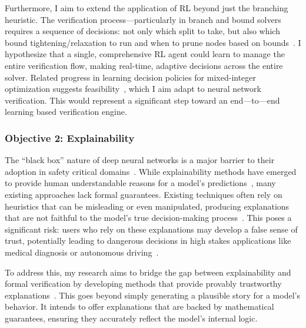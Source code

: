 \documentclass{llncs}
\begin{document}
Furthermore, I aim to extend the application of RL beyond just the branching heuristic.
The verification process—particularly in branch and bound solvers requires a sequence of
decisions: not only which split to take, but also which bound tightening/relaxation to run
and when to prune nodes based on bounds~\cite{BLTTKK-JMLR2020,KBD17,Katz2019Marabou}.
I hypothesize that a single, comprehensive RL agent could learn to manage the entire verification flow, making real-time, 
adaptive decisions across the entire solver. Related progress in learning decision policies for 
mixed-integer optimization suggests feasibility~\cite{Khalil2016LearningToBranch,Gasse2019LearningToBranch}, 
which I aim adapt to neural network verification.  
This would represent a significant step toward an end---to---end learning based verification engine.

\subsubsection{Objective 2: Explainability}
The ``black box'' nature of deep neural networks is a major barrier to their adoption in safety critical domains~\cite{Rudin2019StopExplaining}. 
While explainability methods have emerged to provide human understandable reasons for a model's predictions~\cite{Ribeiro2016LIME,Lundberg2017SHAP,Sundararajan2017IG}, 
many existing approaches lack formal guarantees. Existing techniques often rely on heuristics 
that can be misleading or even manipulated, producing explanations that are not faithful to the 
model's true decision-making process~\cite{Adebayo2018Sanity,Kindermans2017Unreliability,Ghorbani2019Fragile,Slack2020FoolingLIMESHAP}. 
This poses a significant risk: users who rely on these explanations may develop a false sense of trust, 
potentially leading to dangerous decisions in high stakes applications like medical diagnosis or autonomous driving~\cite{Rudin2019StopExplaining}.

To address this, my research aims to bridge the gap between explainability and formal verification by developing 
methods that provide provably trustworthy explanations~\cite{MarquesSilvaIgnatiev2022FormalXAI,BassanKatz2023FormalXAI,WuWuBarrett2023VeriX}.
This goes beyond simply generating a plausible story for a model's behavior. 
It intends to offer explanations that are backed by mathematical guarantees, ensuring they accurately reflect the model's internal logic.
\end{document}
